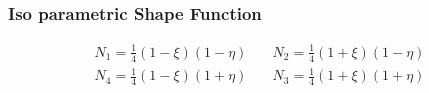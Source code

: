 \documentclass[9pt]{beamer}
\begin{document}
\begin{frame}
\frametitle{Iso parametric Shape Function}
\begin{figure}[h!]
\centering

\end{figure}
\begin{equation*}
\begin{split}
N_1 =\frac{1}{4}\left(1-\xi \right)\left( 1-\eta \right)\quad  & N_2=\frac{1}{4}\left(1+\xi \right)\left( 1-\eta \right) \\
 N_4 =\frac{1}{4}\left(1-\xi \right)\left(1+ \eta \right)\quad  & N_3 =\frac{1}{4}\left(1+\xi \right)\left( 1+\eta \right)
\end{split}
\end{equation*}


\end{frame}
\end{document}
